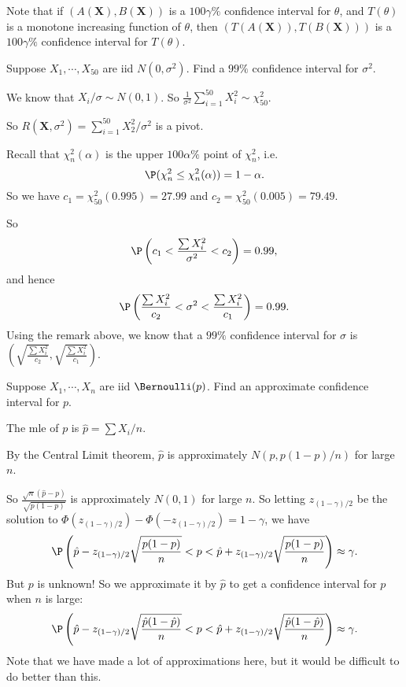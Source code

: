 \documentclass[a4paper]{article}
\begin{document}
Note that if $(A(\mathbf{X}), B(\mathbf{X}))$ is a $100\gamma\%$ confidence interval for $\theta$, and $T(\theta)$ is a monotone increasing function of $\theta$, then $(T(A(\mathbf{X})), T(B(\mathbf{X})))$ is a $100\gamma\%$ confidence interval for $T(\theta)$.
\begin{eg}
  Suppose $X_1, \cdots, X_{50}$ are iid $N(0, \sigma^2)$. Find a $99\%$ confidence interval for $\sigma^2$.

  We know that $X_i/\sigma \sim N(0, 1)$. So $\displaystyle\frac{1}{\sigma^2}\sum_{i = 1}^{50}X_i^2 \sim \chi^2_{50}$.

  So $R(\mathbf{X}, \sigma^2) = \sum_{i = 1}^{50} X_2^2/\sigma^2$ is a pivot.

  Recall that $\chi_n^2(\alpha)$ is the upper $100\alpha\%$ point of $\chi_n^2$, i.e.
  \[
    \P(\chi_n^2 \leq \chi_n^2(\alpha)) = 1 - \alpha.
  \]
  So we have $c_1 = \chi_{50}^2(0.995) = 27.99$ and $c_2 = \chi_{50}^2(0.005) = 79.49$.

  So
  \[
    \P \left(c_1 < \frac{\sum X_i^2}{\sigma^2} < c_2\right) = 0.99,
  \]
  and hence
  \[
    \P\left(\frac{\sum X_i^2}{c_2} < \sigma^2 < \frac{\sum X_i^2}{c_1}\right) = 0.99.
  \]
  Using the remark above, we know that a $99\%$ confidence interval for $\sigma$ is $\left(\sqrt{\frac{\sum X_i^2}{c_2}}, \sqrt{\frac{\sum X_i^2}{c_1}}\right)$.
\end{eg}

\begin{eg}
  Suppose $X_1, \cdots, X_n$ are iid $\Bernoulli(p)$. Find an approximate confidence interval for $p$.

  The mle of $p$ is $\hat p = \sum X_i/n$.

  By the Central Limit theorem, $\hat{p}$ is approximately $N(p, p(1 - p)/n)$ for large $n$.

  So $\displaystyle \frac{\sqrt{n}(\hat{p} - p)}{\sqrt{p(1 - p)}}$ is approximately $N(0, 1)$ for large $n$. So letting $z_{(1-\gamma) / 2}$ be the solution to $\Phi(z_{(1-\gamma) / 2}) - \Phi(-z_{(1-\gamma) / 2}) = 1 - \gamma$, we have
  \[
    \P\left(\hat p - z_{(1 - \gamma)/2}\sqrt{\frac{p(1 - p)}{n}} < p < \hat{p} + z_{(1 - \gamma)/2}\sqrt{\frac{p(1 - p)}{n}}\right)\approx \gamma.
  \]
  But $p$ is unknown! So we approximate it by $\hat{p}$ to get a confidence interval for $p$ when $n$ is large:
  \[
    \P\left(\hat p - z_{(1 - \gamma)/2}\sqrt{\frac{\hat p(1 - \hat p)}{n}} < p < \hat{p} + z_{(1 - \gamma)/2}\sqrt{\frac{\hat p(1 - \hat p)}{n}}\right)\approx \gamma.
  \]
  Note that we have made a lot of approximations here, but it would be difficult to do better than this.
\end{eg}
\end{document}
